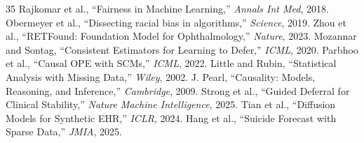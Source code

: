 \documentclass[journal]{IEEEtran}
\begin{document}
\begin{thebibliography}{35}
 Rajkomar et al., ``Fairness in Machine Learning,'' \textit{Annals Int Med}, 2018.
 Obermeyer et al., ``Dissecting racial bias in algorithms,'' \textit{Science}, 2019.
 Zhou et al., ``RETFound: Foundation Model for Ophthalmology,'' \textit{Nature}, 2023.
 Mozannar and Sontag, ``Consistent Estimators for Learning to Defer,'' \textit{ICML}, 2020.
 Parbhoo et al., ``Causal OPE with SCMs,'' \textit{ICML}, 2022.
 Little and Rubin, ``Statistical Analysis with Missing Data,'' \textit{Wiley}, 2002.
 J. Pearl, ``Causality: Models, Reasoning, and Inference,'' \textit{Cambridge}, 2009.
 Strong et al., ``Guided Deferral for Clinical Stability,'' \textit{Nature Machine Intelligence}, 2025.
 Tian et al., ``Diffusion Models for Synthetic EHR,'' \textit{ICLR}, 2024.
 Hang et al., ``Suicide Forecast with Sparse Data,'' \textit{JMIA}, 2025.
\end{thebibliography}
\end{document}
